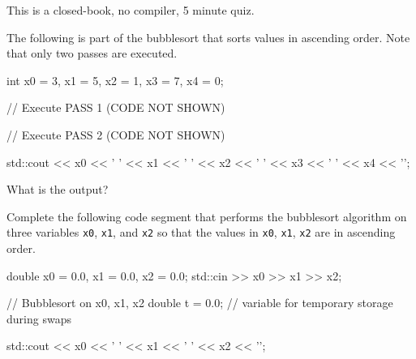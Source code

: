 

This is a closed-book, no compiler, 5 minute quiz.

\nextq
The following is part of the bubblesort that sorts values in ascending order. Note that only two passes are executed.
\begin{console}[fontsize=\footnotesize]
int x0 = 3, x1 = 5, x2 = 1, x3 = 7, x4 = 0;

// Execute PASS 1 (CODE NOT SHOWN)

// Execute PASS 2 (CODE NOT SHOWN)

std::cout << x0 << ' ' << x1 << ' ' << x2 << ' ' << x3 << ' ' << x4 << '\n';
\end{console}
What is the output?
\\
\ANSWER
\begin{answercode}

\end{answercode}

\nextq
Complete the following code segment that performs the bubblesort algorithm on
three variables \verb!x0!, \verb!x1!, and \verb!x2!
so that the values in \verb!x0!, \verb!x1!, \verb!x2! are in ascending order.
\\
\ANSWER
\begin{answercode}
double x0 = 0.0, x1 = 0.0, x2 = 0.0;
std::cin >> x0 >> x1 >> x2;

// Bubblesort on x0, x1, x2
double t = 0.0; // variable for temporary storage during swaps

std::cout << x0 << ' ' << x1 << ' ' << x2 << '\n';
\end{answercode}


